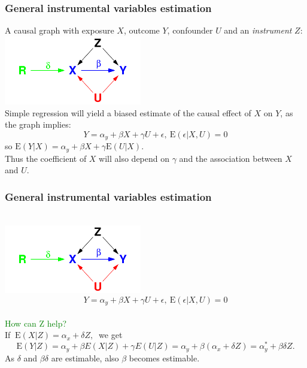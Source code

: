 \documentclass[xcolor=svgnames,handout]{beamer}
\newcommand{\E}{\mathrm{E}}
\begin{document}
\begin{frame}
 \frametitle{General instrumental variables estimation}
A causal graph with exposure $X$, outcome $Y$, confounder $U$ and an \emph{instrument} $Z$:\\
\includegraphics[width=6cm]{instvar} \\
Simple regression will yield a biased estimate of the causal effect of $X$ on $Y$, as the graph implies:
\[ Y= \alpha_y + \beta X + \gamma U +\epsilon,  \  \E(\epsilon|X,U)=0 \]
so $\E(Y|X)= \alpha_y + \beta X + \gamma \E(U|X)$. \\
Thus the coefficient of $X$ will also depend on $\gamma$ and the association between $X$ and $U$. 
\end{frame}

\begin{frame}
 \frametitle{General instrumental variables estimation}
\mbox{ }\\[-1cm]
\includegraphics[width=6cm]{instvar} \\[-0.5cm]
\[ Y= \alpha_y + \beta X + \gamma U +\epsilon,  \  \E(\epsilon|X,U)=0 \]
\mbox{ }\\
\textcolor{green}{How can Z help?} \\
\pause
If $ \ \E(X|Z)=\alpha_x + \delta Z, \ $  we get  \pause
\[
\E(Y|Z) = \alpha_y + \beta E(X|Z) + \gamma E(U|Z)  =   \alpha_y + \beta(\alpha_x + \delta Z) = \alpha_y^* + \beta\delta Z. 
\]
\pause As $\delta$ and $\beta\delta$ are estimable, also $\beta$ becomes estimable. 
\end{frame}
\end{document}
